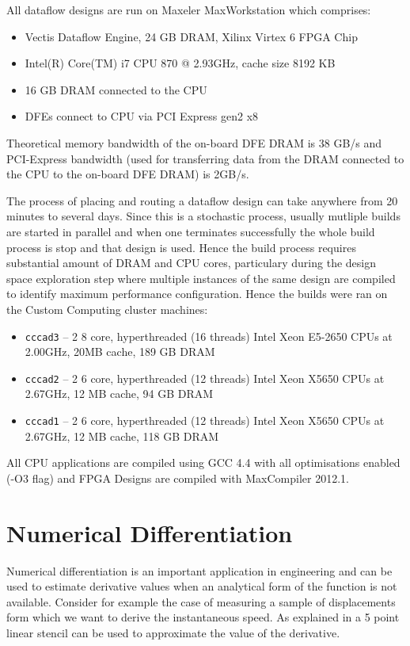 All dataflow designs are run on Maxeler MaxWorkstation
\cite{MaxWorkstation} which comprises:
\begin{itemize}
\item Vectis Dataflow Engine, 24 GB DRAM, Xilinx Virtex 6 FPGA Chip
\item Intel(R) Core(TM) i7 CPU 870 @ 2.93GHz, cache size 8192 KB
\item 16 GB DRAM connected to the CPU
\item DFEs connect to CPU via PCI Express gen2 x8
\end{itemize}

Theoretical memory bandwidth of the on-board DFE DRAM is 38 GB/s and
PCI-Express bandwidth (used for transferring data from the DRAM
connected to the CPU to the on-board DFE DRAM) is 2GB/s.

The process of placing and routing a dataflow design can take anywhere
from 20 minutes to several days. Since this is a stochastic process,
usually mutliple builds are started in parallel and when one
terminates successfully the whole build process is stop and that
design is used. Hence the build process requires substantial amount of
DRAM and CPU cores, particulary during the design space exploration
step where multiple instances of the same design are compiled to
identify maximum performance configuration. Hence the builds were ran
on the Custom Computing cluster machines:

\begin{itemize}
\item \texttt{cccad3} -- 2 8 core, hyperthreaded (16 threads) Intel
  Xeon E5-2650 CPUs at 2.00GHz, 20MB cache, 189 GB DRAM
\item \texttt{cccad2} -- 2 6 core, hyperthreaded (12 threads) Intel
  Xeon X5650 CPUs at 2.67GHz, 12 MB cache, 94 GB DRAM
\item \texttt{cccad1} -- 2 6 core, hyperthreaded (12 threads) Intel Xeon
  X5650 CPUs at 2.67GHz, 12 MB cache, 118 GB DRAM
\end{itemize}

All CPU applications are compiled using GCC 4.4 with all optimisations
enabled (-O3 flag) and FPGA Designs are compiled with MaxCompiler
2012.1.

\section{Numerical Differentiation}

Numerical differentiation is an important application in engineering
and can be used to estimate derivative values when an analytical form
of the function is not available. Consider for example the case of
measuring a sample of displacements form which we want to derive the
instantaneous speed. As explained in  a 5
point linear stencil can be used to approximate the value of the
derivative.

